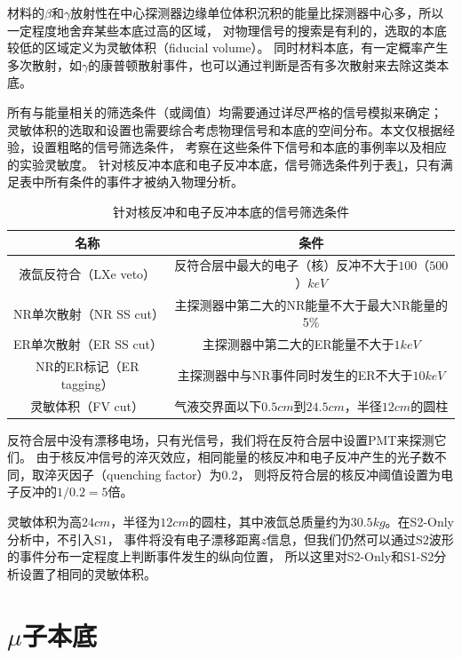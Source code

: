 材料的$\beta$和$\gamma$放射性在中心探测器边缘单位体积沉积的能量比探测器中心多，所以一定程度地舍弃某些本底过高的区域，
对物理信号的搜索是有利的，选取的本底较低的区域定义为灵敏体积（fiducial volume）。
同时材料本底，有一定概率产生多次散射，如$\gamma$的康普顿散射事件，也可以通过判断是否有多次散射来去除这类本底。

所有与能量相关的筛选条件（或阈值）均需要通过详尽严格的信号模拟来确定；
灵敏体积的选取和设置也需要综合考虑物理信号和本底的空间分布。本文仅根据经验，设置粗略的信号筛选条件，
考察在这些条件下信号和本底的事例率以及相应的实验灵敏度。
针对核反冲本底和电子反冲本底，信号筛选条件列于表\ref{tab:cuts}，只有满足表中所有条件的事件才被纳入物理分析。

\begin{table}
  \centering
  \caption{针对核反冲和电子反冲本底的信号筛选条件}
  \begin{tabular}{cc}
    \toprule
    名称 & 条件 \\
    \midrule
    液氙反符合（LXe veto） & 反符合层中最大的电子（核）反冲不大于$100$（$500$）$\si{keV}$ \\
    NR单次散射（NR SS cut） & 主探测器中第二大的NR能量不大于最大NR能量的5\% \\
    ER单次散射（ER SS cut） & 主探测器中第二大的ER能量不大于$1\si{keV}$ \\
    NR的ER标记（ER tagging） & 主探测器中与NR事件同时发生的ER不大于$10\si{keV}$ \\
    灵敏体积（FV cut） & 气液交界面以下$0.5\si{cm}$到$24.5\si{cm}$，半径$12\si{cm}$的圆柱 \\
    \bottomrule
  \end{tabular}
  \label{tab:cuts}
\end{table}

反符合层中没有漂移电场，只有光信号，我们将在反符合层中设置PMT来探测它们。
由于核反冲信号的淬灭效应，相同能量的核反冲和电子反冲产生的光子数不同，取淬灭因子（quenching factor）为0.2，
则将反符合层的核反冲阈值设置为电子反冲的$1/0.2=5$倍。

灵敏体积为高$24\si{cm}$，半径为$12\si{cm}$的圆柱，其中液氙总质量约为$30.5\si{kg}$。在S2-Only分析中，不引入$\mathrm{S1}$，
事件将没有电子漂移距离$z$信息，但我们仍然可以通过$\mathrm{S2}$波形的事件分布一定程度上判断事件发生的纵向位置，
所以这里对S2-Only和S1-S2分析设置了相同的灵敏体积。

\section{$\mu$子本底}

